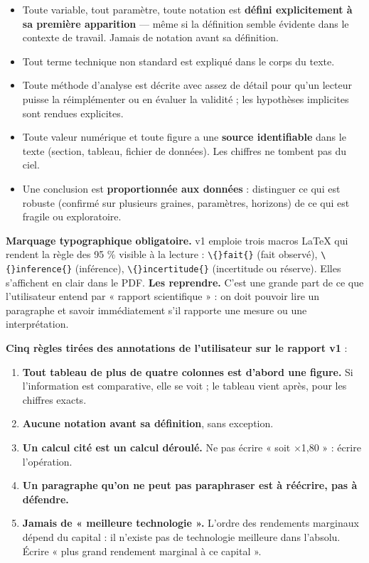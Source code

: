 \documentclass[11pt,a4paper]{article}
\newcommand{\code}[1]{\texttt{#1}}
\begin{document}
\begin{itemize}
\item Toute variable, tout paramètre, toute notation est \textbf{défini explicitement à sa première apparition} --- même si la définition semble évidente dans le contexte de travail. Jamais de notation avant sa définition.
\item Tout terme technique non standard est expliqué dans le corps du texte.
\item Toute méthode d'analyse est décrite avec assez de détail pour qu'un lecteur puisse la réimplémenter ou en évaluer la validité ; les hypothèses implicites sont rendues explicites.
\item Toute valeur numérique et toute figure a une \textbf{source identifiable} dans le texte (section, tableau, fichier de données). Les chiffres ne tombent pas du ciel.
\item Une conclusion est \textbf{proportionnée aux données} : distinguer ce qui est robuste (confirmé sur plusieurs graines, paramètres, horizons) de ce qui est fragile ou exploratoire.
\end{itemize}

\textbf{Marquage typographique obligatoire.} v1 emploie trois macros LaTeX qui rendent la règle des 95 \% visible à la lecture : \code{\textbackslash\{\}fait\{\}} (fait observé), \code{\textbackslash\{\}inference\{\}} (inférence), \code{\textbackslash\{\}incertitude\{\}} (incertitude ou réserve). Elles s'affichent en clair dans le PDF. \textbf{Les reprendre.} C'est une grande part de ce que l'utilisateur entend par « rapport scientifique » : on doit pouvoir lire un paragraphe et savoir immédiatement s'il rapporte une mesure ou une interprétation.

\textbf{Cinq règles tirées des annotations de l'utilisateur sur le rapport v1} :

\begin{enumerate}
\item \textbf{Tout tableau de plus de quatre colonnes est d'abord une figure.} Si l'information est comparative, elle se voit ; le tableau vient après, pour les chiffres exacts.
\item \textbf{Aucune notation avant sa définition}, sans exception.
\item \textbf{Un calcul cité est un calcul déroulé.} Ne pas écrire « soit \ensuremath{\times}1,80 » : écrire l'opération.
\item \textbf{Un paragraphe qu'on ne peut pas paraphraser est à réécrire, pas à défendre.}
\item \textbf{Jamais de « meilleure technologie ».} L'ordre des rendements marginaux dépend du capital : il n'existe pas de technologie meilleure dans l'absolu. Écrire « plus grand rendement marginal à ce capital ».
\end{enumerate}
\end{document}
